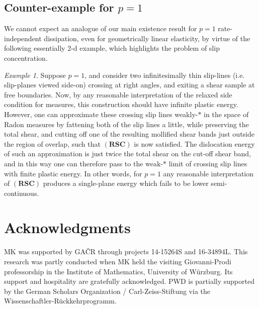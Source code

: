 \documentclass[11pt,reqno]{amsart}
\theoremstyle{plain}
\theoremstyle{definition}
\theoremstyle{remark}
\newtheorem{example}{Example}
\begin{document}
\subsection{Counter-example for $p=1$} We cannot expect an analogue of our main existence result for $p=1$ rate-independent dissipation, even for geometrically linear elasticity, by virtue of the following essentially 2-d example, which highlights the problem of slip concentration. 

\begin{example}\label{ex:2}
Suppose $p=1$, and consider two infinitesimally thin slip-lines (i.e. slip-planes viewed side-on) crossing at right angles, and exiting a shear sample at free boundaries. Now, by any reasonable interpretation of the relaxed side condition for measures, this construction should have infinite plastic energy. However, one can approximate these crossing slip lines weakly-$\ast$ in the space of Radon measures by fattening both of the slip lines a little, while preserving the total shear, and cutting off one of the resulting mollified shear bands just outside the region of overlap, such that $(\textbf{RSC})$ is now satisfied. The dislocation energy of such an approximation is just twice the total shear on the cut-off shear band, and in this way one can therefore pass to the weak-$\ast$ limit of crossing slip lines with finite plastic energy. In other words, for $p=1$ any reasonable interpretation of $(\textbf{RSC})$ produces a single-plane energy which fails to be lower semi-continuous.
\end{example}

\section*{Acknowledgments}
MK was supported by GA\v{C}R through projects 14-15264S and 16-34894L.
This research was partly conducted when MK held the visiting Giovanni-Prodi professorship in the
Institute of Mathematics, University of W\"{u}rzburg. Its support and hospitality are gratefully acknowledged. PWD is partially supported by the German Scholars Organization / Carl-Zeiss-Stiftung via the Wissenschaftler-R{\"u}ckkehrprogramm.
\end{document}
